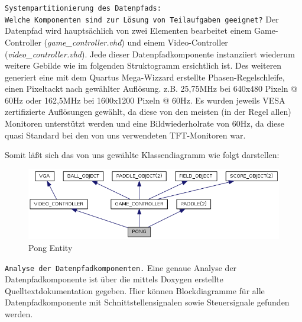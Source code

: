 \documentclass{article}
\begin{document}
\texttt{Systempartitionierung des Datenpfads:\\Welche Komponenten sind zur Lösung von Teilaufgaben geeignet?}
\newline
Der Datenpfad wird hauptsächlich von zwei Elementen bearbeitet einem Game-Controller (\emph{game\_controller.vhd}) und einem Video-Controller 
(\emph{video\_controller.vhd}). Jede dieser Datenpfadkomponente instanziiert wiederum weitere Gebilde wie im folgenden Struktogramm ersichtlich ist.
Des weiteren generiert eine mit dem Quartus Mega-Wizzard erstellte Phasen-Regelschleife, einen Pixeltackt
nach gewählter Auflösung.
z.B. 25,75MHz bei 640x480 Pixeln @ 60Hz oder 162,5MHz bei 1600x1200 Pixeln @ 60Hz.
Es wurden jeweils VESA zertifizierte Auflösungen gewählt, da diese von den meisten (in der Regel allen) Monitoren unterstützt werden und eine
Bildwiederholrate von 60Hz, da diese quasi Standard bei den von uns verwendeten TFT-Monitoren war.		
\vspace{7.5mm}

Somit läßt sich das von uns gewählte Klassendiagramm wie folgt darstellen:
\begin{figure}[here]
	\begin{center}
		\includegraphics[width=0.65 \textwidth]{includes/PONG-Klassendiagramm.png}
		\caption[Pong Entity]{Pong Entity}
		\label{fig:Pong Entity}
	\end{center}
\end{figure}
\vspace{7.5mm}

\texttt{Analyse der Datenpfadkomponenten.}
\newline
Eine genaue Analyse der Datenpfadkomponente ist über die mittels Doxygen erstellte Quelltextdokumentation gegeben.
Hier können Blockdiagramme für alle Datenpfadkomponente mit Schnittstellensignalen sowie Steuersignale gefunden werden.
\vspace{7.5mm}
\end{document}
